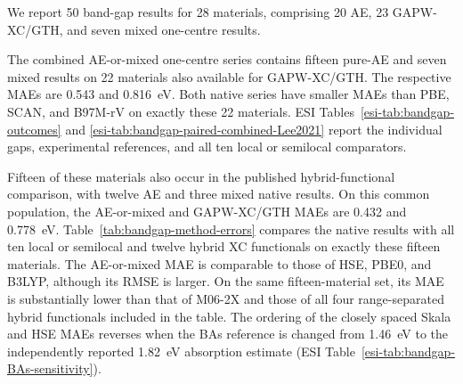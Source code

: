 \documentclass[10pt,a4paper,twocolumn]{article}
\begin{document}
We report 50 band-gap results for 28 materials, comprising 20 AE, 23 GAPW-XC/GTH, and seven mixed one-centre results.

The combined AE-or-mixed one-centre series contains fifteen pure-AE and seven mixed results on 22 materials also available for GAPW-XC/GTH. The respective MAEs are 0.543 and 0.816~eV. Both native series have smaller MAEs than PBE, SCAN, and B97M-rV on exactly these 22 materials. ESI Tables~\ref{esi-tab:bandgap-outcomes} and \ref{esi-tab:bandgap-paired-combined-Lee2021} report the individual gaps, experimental references, and all ten local or semilocal comparators.

Fifteen of these materials also occur in the published hybrid-functional comparison, with twelve AE and three mixed native results. On this common population, the AE-or-mixed and GAPW-XC/GTH MAEs are 0.432 and 0.778~eV. Table~\ref{tab:bandgap-method-errors} compares the native results with all ten local or semilocal and twelve hybrid XC functionals on exactly these fifteen materials. The AE-or-mixed MAE is comparable to those of HSE, PBE0, and B3LYP, although its RMSE is larger. On the same fifteen-material set, its MAE is substantially lower than that of M06-2X and those of all four range-separated hybrid functionals included in the table. The ordering of the closely spaced Skala and HSE MAEs reverses when the BAs reference is changed from 1.46~eV to the independently reported 1.82~eV absorption estimate (ESI Table~\ref{esi-tab:bandgap-BAs-sensitivity}).\cite{Yue2020BAs}
\end{document}
